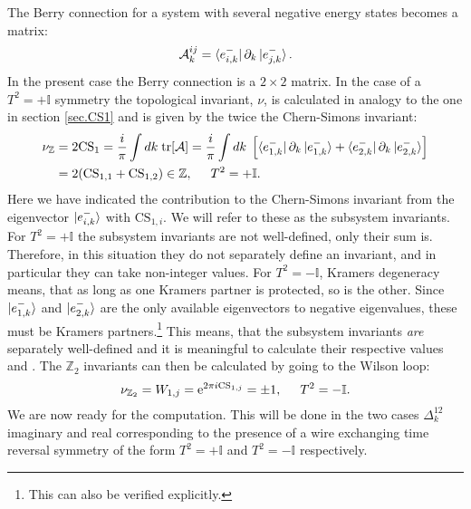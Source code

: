 The Berry connection for a system with several negative energy states becomes a matrix:
\begin{equation}
\mathcal{A}^{ij}_k = \bra{e^{-}_{i,k}}\partial_k\ket{e^{-}_{j,k}}.
\end{equation}
In the present case the Berry connection is a $2\times 2$ matrix. In the case of a $T^2 = + \mathbb{I}$ symmetry the topological invariant, $\nu$, is calculated in analogy to the one in section \ref{sec.CS1} and is given by the twice the Chern-Simons invariant:
\begin{align}
\nu_{\mathbb{Z}} &= 2\text{CS}_1 = \frac{i}{\pi} \int dk\; \text{tr}[\mathcal{A}] = \frac{i}{\pi} \int dk\; \left[\bra{e^{-}_{1,k}}\partial_k\ket{e^{-}_{1,k}} + \bra{e^{-}_{2,k}}\partial_k\ket{e^{-}_{2,k}}  \right] \nonumber \\
 &= 2(\text{CS}_{1,1} + \text{CS}_{1,2})\in \mathbb{Z}, \hspace{0.5cm} T^2 = +\mathbb{I}.
\label{eq.2wires.topinv.T2eqplus1}
\end{align}
Here we have indicated the contribution to the Chern-Simons invariant from the eigenvector $\ket{e^{-}_{i,k}}$ with $\text{CS}_{1,i}$. We will refer to these as the subsystem invariants. For $T^2 = +\mathbb{I}$ the subsystem invariants are not well-defined, only their sum is. Therefore, in this situation they do not separately define an invariant, and in particular they can take non-integer values. For $T^2 = -\mathbb{I}$, Kramers degeneracy means, that as long as one Kramers partner is protected, so is the other. Since $\ket{e^{-}_{1,k}}$ and $\ket{e^{-}_{2,k}}$ are the only available eigenvectors to negative eigenvalues, these must be Kramers partners.\footnote{This can also be verified explicitly.} This means, that the subsystem invariants \textit{are} separately well-defined and it is meaningful to calculate their respective values \cite{FuKane2006, LiYangChen} and \cite[pp. 130-135]{BernevigTITSC}. The $\mathbb{Z}_2$ invariants can then be calculated by going to the Wilson loop:
\begin{equation}
\nu_{\mathbb{Z}_2} = W_{1,j} = \text{e}^{2\pi i\text{CS}_{1,j}} = \pm 1, \hspace{0.5cm} T^2 = -\mathbb{I}.
\label{eq.2wires.topinv.T2eqminus1}
\end{equation}
We are now ready for the computation. This will be done in the two cases $\Delta^{12}_k$ imaginary and real corresponding to the presence of a wire exchanging time reversal symmetry of the form $T^2 = +\mathbb{I}$ and $T^2 = -\mathbb{I}$ respectively.  


